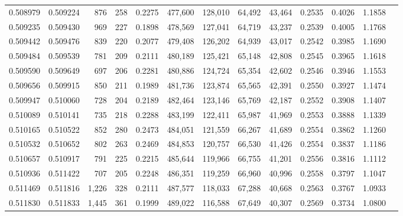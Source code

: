 \begin{tabular}{rrrrrrrrrrrrr}
0.508979 & 0.509224 &    876 &   258 &                                     0.2275 & 477,600 & 128,010 &  64,492 &  43,464 & 0.2535 & 0.4026 & 1.1858 \\
0.509235 & 0.509430 &    969 &   227 &                                     0.1898 & 478,569 & 127,041 &  64,719 &  43,237 & 0.2539 & 0.4005 & 1.1768 \\
0.509442 & 0.509476 &    839 &   220 &                                     0.2077 & 479,408 & 126,202 &  64,939 &  43,017 & 0.2542 & 0.3985 & 1.1690 \\
0.509484 & 0.509539 &    781 &   209 &                                     0.2111 & 480,189 & 125,421 &  65,148 &  42,808 & 0.2545 & 0.3965 & 1.1618 \\
0.509590 & 0.509649 &    697 &   206 &                                     0.2281 & 480,886 & 124,724 &  65,354 &  42,602 & 0.2546 & 0.3946 & 1.1553 \\
0.509656 & 0.509915 &    850 &   211 &                                     0.1989 & 481,736 & 123,874 &  65,565 &  42,391 & 0.2550 & 0.3927 & 1.1474 \\
0.509947 & 0.510060 &    728 &   204 &                                     0.2189 & 482,464 & 123,146 &  65,769 &  42,187 & 0.2552 & 0.3908 & 1.1407 \\
0.510089 & 0.510141 &    735 &   218 &                                     0.2288 & 483,199 & 122,411 &  65,987 &  41,969 & 0.2553 & 0.3888 & 1.1339 \\
0.510165 & 0.510522 &    852 &   280 &                                     0.2473 & 484,051 & 121,559 &  66,267 &  41,689 & 0.2554 & 0.3862 & 1.1260 \\
0.510532 & 0.510652 &    802 &   263 &                                     0.2469 & 484,853 & 120,757 &  66,530 &  41,426 & 0.2554 & 0.3837 & 1.1186 \\
0.510657 & 0.510917 &    791 &   225 &                                     0.2215 & 485,644 & 119,966 &  66,755 &  41,201 & 0.2556 & 0.3816 & 1.1112 \\
0.510936 & 0.511422 &    707 &   205 &                                     0.2248 & 486,351 & 119,259 &  66,960 &  40,996 & 0.2558 & 0.3797 & 1.1047 \\
0.511469 & 0.511816 &  1,226 &   328 &                                     0.2111 & 487,577 & 118,033 &  67,288 &  40,668 & 0.2563 & 0.3767 & 1.0933 \\
0.511830 & 0.511833 &  1,445 &   361 &                                     0.1999 & 489,022 & 116,588 &  67,649 &  40,307 & 0.2569 & 0.3734 & 1.0800 \\

\end{tabular}
